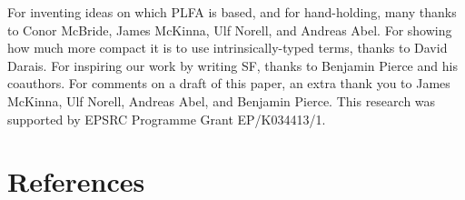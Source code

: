 \documentclass[preprint,authoryear]{elsarticle}
\begin{document}
For inventing ideas on which PLFA is based, and for hand-holding, many thanks to
Conor McBride, James McKinna, Ulf Norell, and Andreas Abel.  For showing how
much more compact it is to use intrinsically-typed terms, thanks to David Darais.  For
inspiring our work by writing SF, thanks to Benjamin Pierce and his coauthors.
For comments on a draft of this paper, an extra thank you to James McKinna, Ulf
Norell, Andreas Abel, and Benjamin Pierce. This research was supported by EPSRC
Programme Grant EP/K034413/1.


\section*{References}



\end{document}
